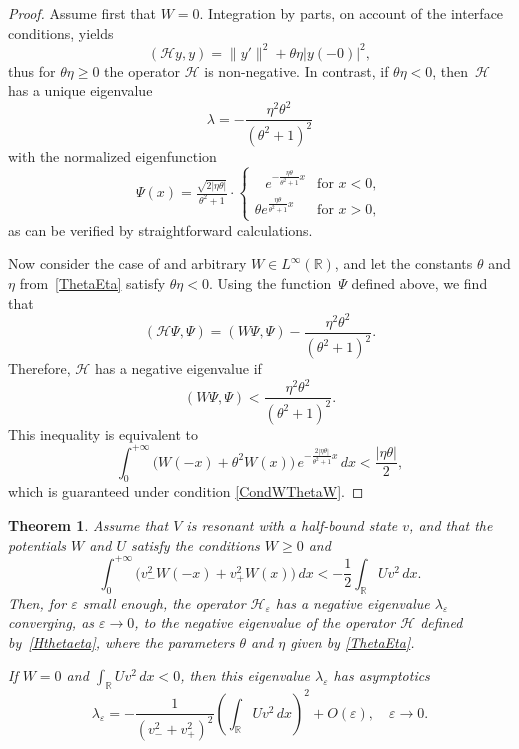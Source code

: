 \documentclass[reqno]{amsart}
\newtheorem{thm}{Theorem}
\theoremstyle{definition}
\theoremstyle{remark}
\numberwithin{equation}{section}
\newcommand{\Real}{\mathbb R}
\newcommand{\eps}{\varepsilon}
\newcommand{\cH}{\mathcal{H}}
\begin{document}
\begin{proof}
Assume first that $W=0$. Integration by parts, on account of the interface conditions, yields
\begin{equation*}
    ( \cH y, y) = \|y'\|^2 + \theta\eta |y(-0)|^2,
\end{equation*}
thus for $\theta\eta\ge0$ the operator $\cH$ is non-negative. In contrast, if $\theta\eta<0$, then~$\cH$  has a unique eigenvalue
 \begin{equation}\label{EigenvalueH}
 \lambda =-\frac{\eta^2\theta^2}{(\theta^2+1)^2}
\end{equation}
with the normalized eigenfunction
\begin{equation*}
  \Psi(x)= \tfrac{\sqrt{2|\eta\theta|}}{\theta^2+1}\cdot
  \begin{cases}
   \phantom{A} e^{-\frac{\eta\theta}{\theta^2+1} x}& \text{for } x<0,\\
    \theta e^{\frac{\eta\theta}{\theta^2+1} x}& \text{for } x>0,
  \end{cases}
\end{equation*}
as can be verified by straightforward calculations.

Now consider the case of and arbitrary $W\in L^\infty(\Real)$, and let the constants $\theta$ and $\eta$ from~\eqref{ThetaEta} satisfy $\theta\eta<0$. Using the function~$\Psi$ defined above, we find that
  \begin{equation*}
    (\cH\Psi,\Psi)=(W\Psi,\Psi)-
    \frac{\eta^2\theta^2}{(\theta^2+1)^2}.
  \end{equation*}
Therefore, $\cH$ has a negative eigenvalue if
\begin{equation*}
 (W\Psi,\Psi)<\frac{\eta^2\theta^2}{(\theta^2+1)^2}.
\end{equation*}
This inequality is equivalent to
\begin{equation*}
  \int_0^{+\infty}\big(W(-x)+\theta^2 W(x)\big)\,e^{-\frac{2|\eta\theta|}{\theta^2+1} x}\,dx<\frac{|\eta\theta|}{2},
\end{equation*}
which is guaranteed under condition \eqref{CondWThetaW}.
\end{proof}	

\begin{thm}\label{TheoremWDelta}
Assume that $V$ is resonant with a half-bound state $v$, and that the potentials $W$ and $U$ satisfy the conditions $W\ge0$ and
\begin{equation}\label{CondEVexistsPrime}
  \int_0^{+\infty}\big(v_-^2W(-x)+ v_+^2 W(x)\big)\,dx<-\frac12 \int_\Real U v^2\,dx.
\end{equation}
Then, for $\eps$ small enough, the operator $\cH_\eps$ has a negative eigenvalue $\lambda_\eps$ converging, as $\eps\to 0$, to the negative eigenvalue of the operator $\cH$ defined by~\eqref{Hthetaeta}, where the parameters $\theta$ and $\eta$ given by \eqref{ThetaEta}.

If $W=0$ and $\int_\Real U v^2\,dx<0$, then this eigenvalue $\lambda_\eps$ has asymptotics
\begin{equation}\label{NFEW0}
  \lambda_\eps=-\frac1{(v_-^2+ v_+^2)^2}\left(\int_\Real U v^2\,dx\right)^2+O(\eps), \quad \eps\to 0.
\end{equation}
\end{thm}
\end{document}
